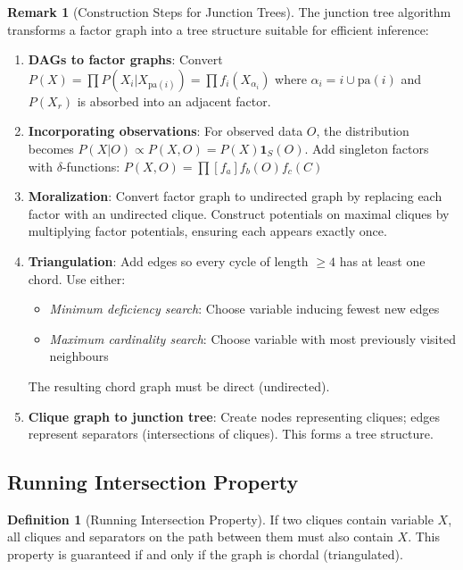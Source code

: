 \documentclass[12pt,a4paper]{article}
\theoremstyle{definition}
\newtheorem{definition}{Definition}[section]
\newtheorem{remark}{Remark}[section]
\begin{document}
\begin{remark}[Construction Steps for Junction Trees]
The junction tree algorithm transforms a factor graph into a tree structure suitable for efficient inference:

\begin{enumerate}
    \item \textbf{DAGs to factor graphs}: Convert $P(X) = \prod P(X_i | X_{\text{pa}(i)}) = \prod f_i(X_{\alpha_i})$ where $\alpha_i = i \cup \text{pa}(i)$ and $P(X_r)$ is absorbed into an adjacent factor.
    
    \item \textbf{Incorporating observations}: For observed data $O$, the distribution becomes $P(X | O) \propto P(X, O) = P(X) \mathbf{1}_S(O)$. Add singleton factors with $\delta$-functions: $P(X, O) = \prod [f_a] f_b(O) f_c(C)$
    
    \item \textbf{Moralization}: Convert factor graph to undirected graph by replacing each factor with an undirected clique. Construct potentials on maximal cliques by multiplying factor potentials, ensuring each appears exactly once.
    
    \item \textbf{Triangulation}: Add edges so every cycle of length $\geq 4$ has at least one chord. Use either:
    \begin{itemize}
        \item \textit{Minimum deficiency search}: Choose variable inducing fewest new edges
        \item \textit{Maximum cardinality search}: Choose variable with most previously visited neighbours
    \end{itemize}
    The resulting chord graph must be direct (undirected).
    
    \item \textbf{Clique graph to junction tree}: Create nodes representing cliques; edges represent separators (intersections of cliques). This forms a tree structure.
\end{enumerate}
\end{remark}

\subsection{Running Intersection Property}

\begin{definition}[Running Intersection Property]
If two cliques contain variable $X$, all cliques and separators on the path between them must also contain $X$. This property is guaranteed if and only if the graph is chordal (triangulated).
\end{definition}
\end{document}
